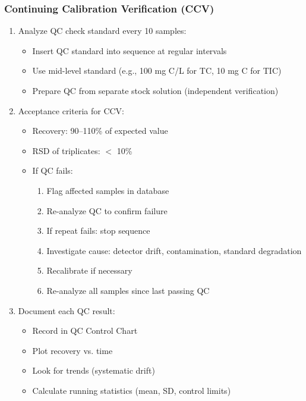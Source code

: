 \documentclass[11pt,a4paper]{article}\usepackage[]{graphicx}\usepackage[]{xcolor}
\begin{document}
\subsubsection{Continuing Calibration Verification (CCV)}
\begin{enumerate}[noitemsep]
    \item Analyze QC check standard every 10 samples:
    \begin{itemize}
        \item Insert QC standard into sequence at regular intervals
        \item Use mid-level standard (e.g., 100 mg C/L for TC, 10 mg C for TIC)
        \item Prepare QC from separate stock solution (independent verification)
    \end{itemize}
    \item Acceptance criteria for CCV:
    \begin{itemize}
        \item Recovery: 90--110\% of expected value
        \item RSD of triplicates: $<$ 10\%
        \item If QC fails:
        \begin{enumerate}
            \item Flag affected samples in database
            \item Re-analyze QC to confirm failure
            \item If repeat fails: stop sequence
            \item Investigate cause: detector drift, contamination, standard degradation
            \item Recalibrate if necessary
            \item Re-analyze all samples since last passing QC
        \end{enumerate}
    \end{itemize}
    \item Document each QC result:
    \begin{itemize}
        \item Record in QC Control Chart
        \item Plot recovery vs. time
        \item Look for trends (systematic drift)
        \item Calculate running statistics (mean, SD, control limits)
    \end{itemize}
\end{enumerate}
\end{document}

